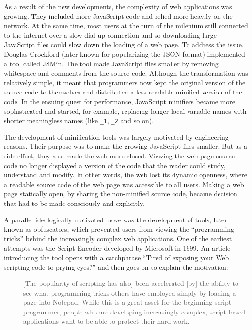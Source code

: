 As a result of the new developments, the complexity of web applications was growing. They
included more JavaScript code and relied more heavily on the network. At the same time, most
users at the turn of the milenium still connected to the internet over a slow dial-up connection
and so downloading large JavaScript files could slow down the loading of a web page.
To address the issue, Douglas Crockford (later known for popularizing the JSON format) implemented
a tool called JSMin. The tool made JavaScript files smaller by removing
whitespace and comments from the source code. Although the transformation was relatively simple,
it meant that programmers now kept the original version of the source code to themselves
and distributed a less readable minified version of the code. In the ensuing quest for performance,
JavaScript minifiers became more sophisticated and started, for example, replacing longer local variable
names with shorter meaningless names (like \texttt{\_1}, \texttt{\_2} and so on).

The development of minification tools was largely motivated by engineering reasons. Their
purpose was to make the growing JavaScript files smaller. But as a side effect, they also made
the web more closed. Viewing the web page source code no longer displayed a version of the
code that the reader could study, understand and modify. In other words, the web lost its dynamic
openness, where a readable source code of the web page was accessible to all users. Making a
web page statically open, by sharing the non-minified source code, became decision that had
to be made consciously and explicitly.

A parallel ideologically motivated move was the development of tools, later known as obfuscators,
which prevented users from viewing the ``programming tricks'' behind the increasingly complex web
applications. One of the earliest attempts was the Script Encoder developed by Microsoft in
1999. An article introducing the tool opens with a catchphrase ``Tired
of exposing your Web scripting code to prying eyes?'' and then goes on to explain the motivation:

\begin{quote}
[The popularity of scripting has also] been accelerated [by] the ability to see what
programming tricks others have employed simply by loading a page into Notepad. While this is a
great asset for the beginning script programmer, people who are developing increasingly complex,
script-based applications want to be able to protect their hard work.
\end{quote}

